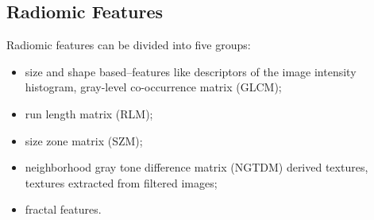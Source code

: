 \documentclass{standalone}
\begin{document}
\subsection{Radiomic Features}

Radiomic features can be divided into five groups\cite{wiki:Radiomics, tesicoppola}:
\begin{itemize}
    \item size and shape based–features like descriptors of the image intensity histogram, gray-level co-occurrence matrix (GLCM);
    \item run length matrix (RLM);
    \item size zone matrix (SZM);
    \item neighborhood gray tone difference matrix (NGTDM) derived textures, textures extracted from filtered images;
    \item fractal features.
\end{itemize}
\end{document}
